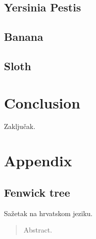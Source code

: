 \documentclass[times, utf8, diplomski]{fer}
\begin{document}
\section{Yersinia Pestis}
\section{Banana}
\section{Sloth}

\chapter{Conclusion}
Zaključak.

\chapter{Appendix}
\section{Fenwick tree}




\begin{sazetak}
Sažetak na hrvatskom jeziku.

\end{sazetak}

\begin{abstract}
Abstract.

\end{abstract}
\end{document}
